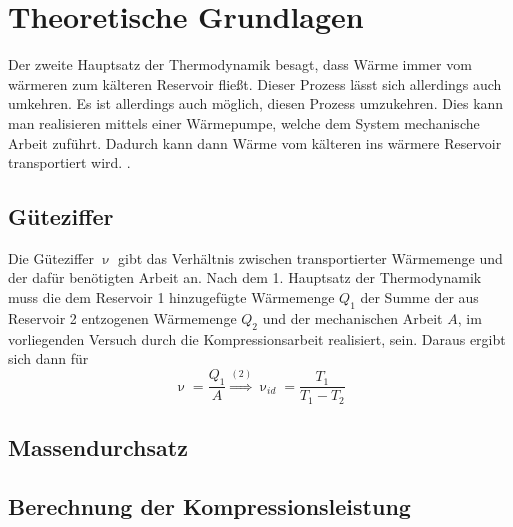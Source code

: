 \section{Theoretische Grundlagen}
\label{sec:Theorie}

Der zweite Hauptsatz der Thermodynamik besagt, dass Wärme immer vom wärmeren zum kälteren Reservoir fließt. Dieser Prozess lässt sich allerdings auch umkehren.
Es ist allerdings auch möglich, diesen Prozess umzukehren. Dies kann man realisieren mittels einer Wärmepumpe, welche dem System mechanische Arbeit zuführt. Dadurch kann dann
Wärme vom kälteren ins wärmere Reservoir transportiert wird.
.

\subsection {Güteziffer}
\label{sec:güteziffer}
Die Güteziffer $\upnu$ gibt das Verhältnis zwischen transportierter Wärmemenge und der dafür benötigten Arbeit an. Nach dem 1. Hauptsatz der Thermodynamik muss die dem Reservoir 1 hinzugefügte Wärmemenge $Q_1$
der Summe der aus Reservoir 2 entzogenen Wärmemenge $Q_2$ und der mechanischen Arbeit $A$, im vorliegenden Versuch durch die Kompressionsarbeit realisiert, sein.
Daraus ergibt sich dann für
\begin{equation}
  \upnu=\frac{Q_1}{A}\stackrel{(2)}{\Rightarrow} \upnu_{id}=\frac{T_1}{T_1-T_2}
\end{equation}

\subsection {Massendurchsatz}
\label{sec:massendurchsatz}
\subsection {Berechnung der Kompressionsleistung}
\label{sec:kompressorleistung}









\cite{Anleitung}
